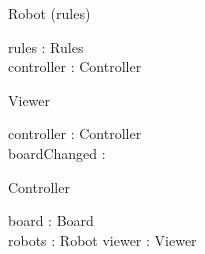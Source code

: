 \documentclass[12pt]{article}
\begin{document}
\begin{class}{Robot}
\upharpoonright (rules) \\
\begin{state}
rules : Rules \\
controller : Controller
\end{state}
\end{class}

\begin{class}{Viewer}
\begin{state}
controller : Controller \\
boardChanged : \bool
\end{state}
\end{class}

\begin{class}{Controller}
\begin{state}
board : Board \\
robots : \power Robot
viewer : Viewer
\end{state}
\end{class}
\end{document}
